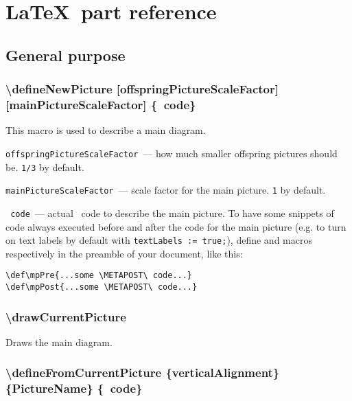 
\section{\LaTeX\ part reference}

\subsection{General purpose}

\sloppy

\subsubsection{\textbackslash defineNewPicture [offspringPicture\-Sca\-leFactor] [mainPicture\-Sca\-le\-Factor] \{\METAPOST\ code\}}\label{defineNewPicture}

\fussy 

	This macro is used to describe a main diagram.

	\texttt{offspringPictureScaleFactor}~— how much smaller offspring pictures should be. \texttt{1/3} by default.
	
	\texttt{mainPictureScaleFactor}~— scale factor for the main picture. \texttt{1} by default.
	
	\texttt{\METAPOST\ code}~— actual \METAPOST\ code to describe the main picture. To have some snippets of code always executed before and after the code for the main picture (e.g. to turn on text labels by default with \texttt{textLabels := true;}), define  and  macros respectively in the preamble of your document, like this:
	
\begin{lstlisting}
\def\mpPre{...some \METAPOST\ code...}
\def\mpPost{...some \METAPOST\ code...}
\end{lstlisting}


\subsubsection{\textbackslash drawCurrentPicture}
	
	Draws the main diagram.




\sloppy

\subsubsection{\textbackslash defineFromCurrentPicture \{verticalAlignment\} \{PictureName\} \{\METAPOST\ code\}}

